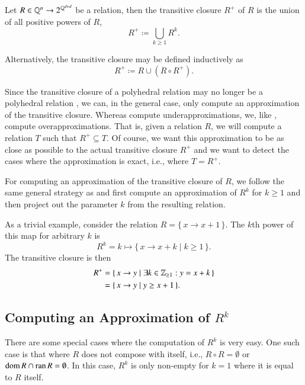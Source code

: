 \begin{definition}
Let $R \in \mathbb{Q}^n \to 2^{\mathbb{Q}^{d+d}}$ be a relation,
then the transitive closure $R^+$ of $R$ is the union
of all positive powers of $R$,
$$
R^+ \coloneqq \bigcup_{k \ge 1} R^k
.
$$
\end{definition}
Alternatively, the transitive closure may be defined
inductively as
\begin{equation}
\label{eq:transitive:inductive}
R^+ \coloneqq R \cup \left(R \circ R^+\right)
.
\end{equation}

Since the transitive closure of a polyhedral relation
may no longer be a polyhedral relation ,
we can, in the general case, only compute an approximation
of the transitive closure.
Whereas  compute underapproximations,
we, like , compute overapproximations.
That is, given a relation $R$, we will compute a relation $T$
such that $R^+ \subseteq T$.  Of course, we want this approximation
to be as close as possible to the actual transitive closure
$R^+$ and we want to detect the cases where the approximation is
exact, i.e., where $T = R^+$.

For computing an approximation of the transitive closure of $R$,
we follow the same general strategy as 
and first compute an approximation of $R^k$ for $k \ge 1$ and then project
out the parameter $k$ from the resulting relation.

\begin{example}
As a trivial example, consider the relation
$R = \{\, x \to x + 1 \,\}$.  The $k$th power of this map
for arbitrary $k$ is
$$
R^k = k \mapsto \{\, x \to x + k \mid k \ge 1 \,\}
.
$$
The transitive closure is then
$$
\begin{aligned}
R^+ & = \{\, x \to y \mid \exists k \in \mathbb{Z}_{\ge 1} : y = x + k \,\}
\\
& = \{\, x \to y \mid y \ge x + 1 \,\}
.
\end{aligned}
$$
\end{example}

\subsection{Computing an Approximation of $R^k$}
\label{s:power}

There are some special cases where the computation of $R^k$ is very easy.
One such case is that where $R$ does not compose with itself,
i.e., $R \circ R = \emptyset$ or $\mathop{\rm dom}\nolimits R \cap \mathop{\rm ran}\nolimits R = \emptyset$.
In this case, $R^k$ is only non-empty for $k=1$ where it is equal
to $R$ itself.

